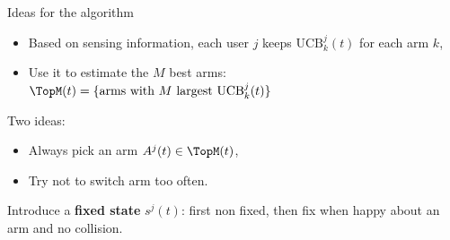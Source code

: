 \documentclass[12pt,english,ignorenonframetext,aspectratio=169,]{beamer}
\providecommand{\tightlist}{%
  \setlength{\itemsep}{0pt}\setlength{\parskip}{0pt}}
\begin{document}
\begin{frame}{Ideas for the \MCTopM{} algorithm}

\begin{itemize}\tightlist
\item
  Based on sensing information, each user \(j\) keeps \(\mathrm{UCB}_k^j(t)\) for each arm \(k\),
\item
  Use it to estimate the \(M\) best arms: \(\TopM(t) = \{\text{arms with } M \text{ largest } \mathrm{UCB}_k^j(t)\}\)
\end{itemize}

Two ideas:
\begin{itemize}\tightlist
  \item
  Always pick an arm \(A^j(t) \in \TopM(t)\),
  \item
  Try not to switch arm too often.
\end{itemize}

Introduce a \textbf{fixed state} \(s^j(t)\):\newline
first non fixed, then fix when happy about an arm and no collision.

\end{frame}
\end{document}
